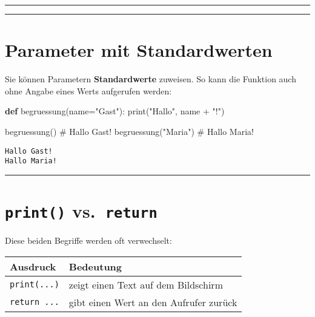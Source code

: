 \documentclass[
  letterpaper,
  DIV=11,
  numbers=noendperiod]{scrreprt}
\newenvironment{Shaded}{\begin{snugshade}}{\end{snugshade}}
\newcommand{\BuiltInTok}[1]{\textcolor[rgb]{0.00,0.23,0.31}{#1}}
\newcommand{\CommentTok}[1]{\textcolor[rgb]{0.37,0.37,0.37}{#1}}
\newcommand{\KeywordTok}[1]{\textcolor[rgb]{0.00,0.23,0.31}{\textbf{#1}}}
\newcommand{\NormalTok}[1]{\textcolor[rgb]{0.00,0.23,0.31}{#1}}
\newcommand{\OperatorTok}[1]{\textcolor[rgb]{0.37,0.37,0.37}{#1}}
\newcommand{\StringTok}[1]{\textcolor[rgb]{0.13,0.47,0.30}{#1}}
\begin{document}
\begin{tcolorbox}
\begin{tcolorbox}
\begin{tcolorbox}
\end{tcolorbox}

\end{tcolorbox}

\begin{center}\rule{0.5\linewidth}{0.5pt}\end{center}

\begin{center}\rule{0.5\linewidth}{0.5pt}\end{center}

\section{Parameter mit
Standardwerten}\label{parameter-mit-standardwerten}

Sie können Parametern \textbf{Standardwerte} zuweisen. So kann die
Funktion auch ohne Angabe eines Werts aufgerufen werden:

\begin{Shaded}
\begin{Highlighting}[]
\KeywordTok{def}\NormalTok{ begruessung(name}\OperatorTok{=}\StringTok{"Gast"}\NormalTok{):}
    \BuiltInTok{print}\NormalTok{(}\StringTok{"Hallo"}\NormalTok{, name }\OperatorTok{+} \StringTok{"!"}\NormalTok{)}

\NormalTok{begruessung()         }\CommentTok{\# Hallo Gast!}
\NormalTok{begruessung(}\StringTok{"Maria"}\NormalTok{)  }\CommentTok{\# Hallo Maria!}
\end{Highlighting}
\end{Shaded}

\begin{verbatim}
Hallo Gast!
Hallo Maria!
\end{verbatim}

\begin{center}\rule{0.5\linewidth}{0.5pt}\end{center}

\section{\texorpdfstring{\texttt{print()}
vs.~\texttt{return}}{print() vs.~return}}\label{print-vs.-return}

Diese beiden Begriffe werden oft verwechselt:

\begin{longtable}[]{@{}ll@{}}
\toprule\noalign{}
Ausdruck & Bedeutung \\
\midrule\noalign{}
\endhead
\bottomrule\noalign{}
\endlastfoot
\texttt{print(...)} & zeigt einen Text auf dem Bildschirm \\
\texttt{return\ ...} & gibt einen Wert an den Aufrufer zurück \\
\end{longtable}


\end{tcolorbox}
\end{document}
